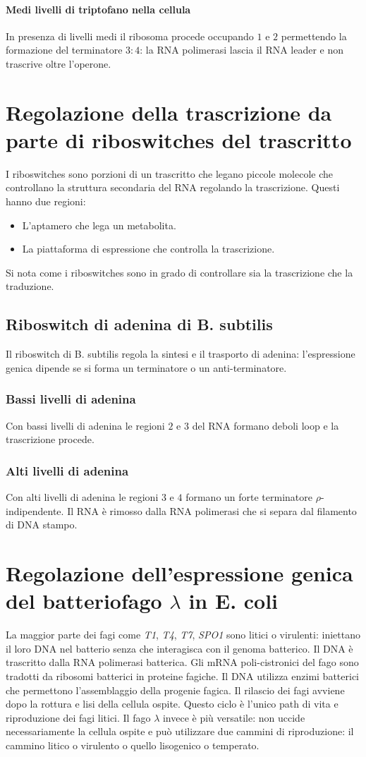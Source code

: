 \paragraph{Medi livelli di triptofano nella cellula}
In presenza di livelli medi il ribosoma procede occupando $1$ e $2$ permettendo la formazione del terminatore $3:4$: la RNA polimerasi lascia il RNA leader e non trascrive oltre 
l'operone. 
\section{Regolazione della trascrizione da parte di riboswitches del trascritto}
I riboswitches sono porzioni di un trascritto che legano piccole molecole che controllano la struttura secondaria del RNA regolando la trascrizione. Questi hanno due regioni: 
\begin{itemize}
	\item L'aptamero che lega un metabolita.
	\item La piattaforma di espressione che controlla la trascrizione. 
\end{itemize}
Si nota come i riboswitches sono in grado di controllare sia la trascrizione che la traduzione. 
\subsection{Riboswitch di adenina di B. subtilis}
Il riboswitch di B. subtilis regola la sintesi e il trasporto di adenina: l'espressione genica dipende se si forma un terminatore o un anti-terminatore.
\subsubsection{Bassi livelli di adenina}
Con bassi livelli di adenina le regioni $2$ e $3$ del RNA formano deboli loop e la trascrizione procede.
\subsubsection{Alti livelli di adenina}
Con alti livelli di adenina le regioni $3$ e $4$ formano un forte terminatore $\rho$-indipendente. Il RNA \`e rimosso dalla RNA polimerasi che si separa dal filamento di DNA stampo. 
\section{Regolazione dell'espressione genica del batteriofago $\lambda$ in E. coli}
La maggior parte dei fagi come \emph{T1}, \emph{T4}, \emph{T7}, \emph{SPO1} sono litici o virulenti: iniettano il loro DNA nel batterio senza che interagisca con il genoma batterico. 
Il DNA \`e trascritto dalla RNA polimerasi batterica. Gli mRNA poli-cistronici del fago sono tradotti da ribosomi batterici in proteine fagiche. Il DNA utilizza enzimi batterici che 
permettono l'assemblaggio della progenie fagica. Il rilascio dei fagi avviene dopo la rottura e lisi della cellula ospite. Questo ciclo \`e l'unico path di vita e riproduzione
dei fagi litici. Il fago $\lambda$ invece \`e pi\`u versatile: non uccide necessariamente la cellula ospite e pu\`o utilizzare due cammini di riproduzione: il cammino litico o virulento
o quello lisogenico o temperato. 
